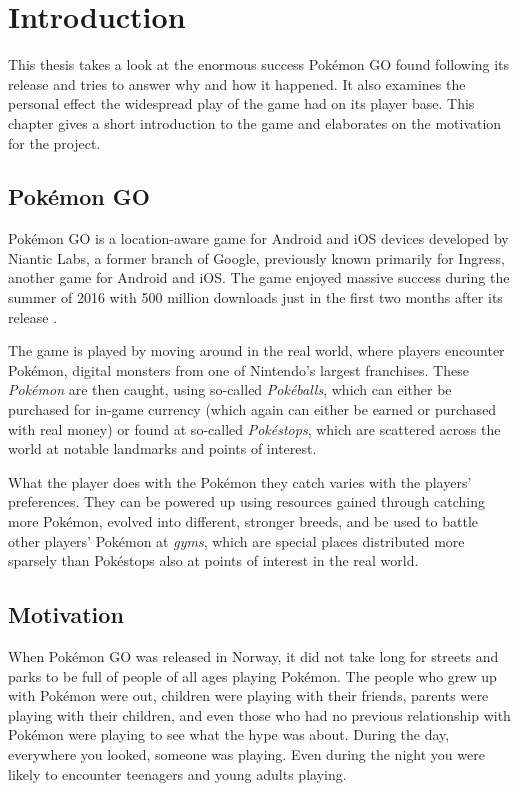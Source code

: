 \chapter{Introduction}
\label{chapter:introduction}

This thesis takes a look at the enormous success Pokémon GO found following its release and tries to answer why and how it happened. It also examines the personal effect the widespread play of the game had on its player base. This chapter gives a short introduction to the game and elaborates on the motivation for the project.

\section{Pokémon GO}
\label{sec:about-pokemon-go}

Pokémon GO is a location-aware game for Android and iOS devices developed by Niantic Labs, a former branch of Google, previously known primarily for Ingress, another game for Android and iOS. The game enjoyed massive success during the summer of 2016 with 500 million downloads just in the first two months after its release .

The game is played by moving around in the real world, where players encounter Pokémon, digital monsters from one of Nintendo's largest franchises. These \emph{Pokémon} are then caught, using so-called \emph{Pokéballs}, which can either be purchased for in-game currency (which again can either be earned or purchased with real money) or found at so-called \emph{Pokéstops}, which are scattered across the world at notable landmarks and points of interest.

What the player does with the Pokémon they catch varies with the players' preferences. They can be powered up using resources gained through catching more Pokémon, evolved into different, stronger breeds, and be used to battle other players' Pokémon at \emph{gyms}, which are special places distributed more sparsely than Pokéstops also at points of interest in the real world.

\section{Motivation}

When Pokémon GO was released in Norway, it did not take long for streets and parks to be full of people of all ages playing Pokémon. The people who grew up with Pokémon were out, children were playing with their friends, parents were playing with their children, and even those who had no previous relationship with Pokémon were playing to see what the hype was about. During the day, everywhere you looked, someone was playing. Even during the night you were likely to encounter teenagers and young adults playing.

